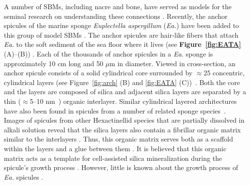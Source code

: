\documentclass[12pt,onecolumn]{article}
\makeatletter
\newcommand{\EA}{\textit{Ea.\@}\xspace}
\makeatother
\begin{document}
A number of SBMs, including nacre and bone, have served as models for the seminal research on understanding these connections \cite{jackson1988,currey1977}. Recently, the anchor spicules of the marine sponge \textit{Euplectella aspergillum} (\EA) have been added to this group of model SBMs \cite{mayer2005rigid,mayer2011new,kolednik2011bioinspired,walter2007mechanisms}. The anchor spicules are hair-like fibers that attach \EA to the soft sediment of the sea floor where it lives (see {\bf Figure~\ref{fig:EATA}} (A)--(B)) \cite{weaver2007hierarchical}. Each of the thousands of anchor spicules in a \EA sponge is approximately 10 cm long and 50 $\mu$m in diameter. Viewed in cross-section, an anchor spicule consists of a solid cylindrical core surrounded by $\approx$25 concentric, cylindrical layers (see Figure~\ref{fig:arch} (B) and \ref{fig:EATA} (C))~\cite{aizenberg2005skeleton,weaver2007hierarchical,monn2015new}. Both the core and the layers are composed of silica and adjacent silica layers are separated by a thin ($\approx$5--10 nm~\cite{weaver2007hierarchical}) organic interlayer.
Similar cylindrical layered architectures have also been found in spicules from a number of related sponge species~\cite{sarikaya2001biomimetic,weaver2010unifying,levi1989remarkably,wang2010silica}. Images of spicules from other Hexactinellid species that are partially dissolved in alkali solution reveal that the silica layers also contain a fibrillar organic matrix similar to the interlayers \cite{ehrlich2006modern, ehrlich2008nanostructural, ehrlich2010mineralization}. Thus, this organic matrix serves both as a scaffold within the layers and a glue between them \cite{ehrlich2016supercontinuum}. 
%
It is believed that this organic matrix acts as a template for cell-assisted silica mineralization during the spicule's growth process \cite{ehrlich2006modern, ehrlich2008nanostructural, ehrlich2010mineralization, wysokowski2018biosilica}. However, little is known about the growth process of \EA spicules \cite{wysokowski2018biosilica}.
%
\end{document}
